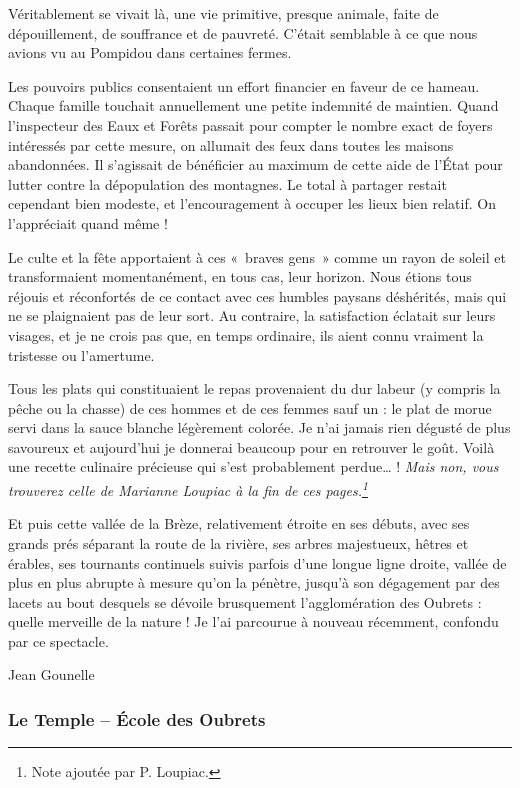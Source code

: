 Véritablement se vivait là, une vie primitive, presque animale, faite de dépouillement,
de souffrance et de pauvreté. C’était semblable à ce que nous avions vu au Pompidou
dans certaines fermes.

Les pouvoirs publics consentaient un effort financier en faveur de ce hameau. Chaque
famille touchait annuellement une petite indemnité de maintien. Quand l’inspecteur
des Eaux et Forêts passait pour compter le nombre exact de foyers intéressés par cette
mesure, on allumait des feux dans toutes les maisons abandonnées. Il s’agissait de
bénéficier au maximum de cette aide de l’État pour lutter contre la dépopulation des
montagnes. Le total à partager restait cependant bien modeste, et l’encouragement à
occuper les lieux bien relatif. On l’appréciait quand même !

Le culte et la fête apportaient à ces «~braves gens~» comme un rayon de soleil et
transformaient momentanément, en tous cas, leur horizon. Nous étions tous réjouis et
réconfortés de ce contact avec ces humbles paysans déshérités, mais qui ne se
plaignaient pas de leur sort. Au contraire, la satisfaction éclatait sur leurs visages, et
je ne crois pas que, en temps ordinaire, ils aient connu vraiment la tristesse ou
l’amertume.

Tous les plats qui constituaient le repas provenaient du dur labeur (y compris la pêche
ou la chasse) de ces hommes et de ces femmes sauf un : le plat de morue servi dans la
sauce blanche légèrement colorée. Je n’ai jamais rien dégusté de plus savoureux et
aujourd’hui je donnerai beaucoup pour en retrouver le goût. Voilà une recette
culinaire précieuse qui s’est probablement perdue… ! \textit{Mais non, vous trouverez celle de
Marianne Loupiac à la fin de ces pages.\footnote{Note ajoutée par P. Loupiac.}}

Et puis cette vallée de la Brèze, relativement étroite en ses débuts, avec ses grands prés
séparant la route de la rivière, ses arbres majestueux, hêtres et érables, ses tournants
continuels suivis parfois d’une longue ligne droite, vallée de plus en plus abrupte à
mesure qu’on la pénètre, jusqu’à son dégagement par des lacets au bout desquels se
dévoile brusquement l’agglomération des Oubrets : quelle merveille de la nature ! Je
l’ai parcourue à nouveau récemment, confondu par ce spectacle.

\hfill Jean Gounelle


\subsubsection{Le Temple -- École des Oubrets}

